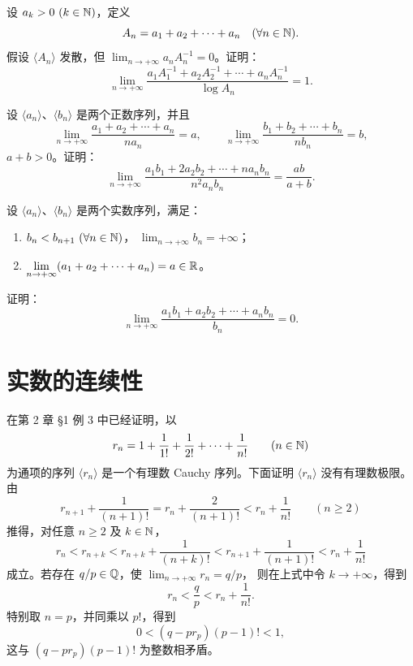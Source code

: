 \begin{exercise}
  \item 设 \(a_k>0\ (k\in\mathbb{N})\)，定义
  \[
  A_n=a_1+a_2+\cdots+a_n\quad(\forall n\in\mathbb{N}).
  \]
  假设 \(\langle A_n\rangle\) 发散，但
  \(\lim_{n\to+\infty}a_nA_n^{-1}=0\)。证明：
  \[
  \lim_{n\to+\infty}
  \frac{a_1A_1^{-1}+a_2A_2^{-1}+\cdots+a_nA_n^{-1}}{\log A_n}=1.
  \]
\end{exercise}

\begin{exercise}
  \item 设 \(\langle a_n\rangle\)、\(\langle b_n\rangle\) 是两个正数序列，并且
  \[
  \lim_{n\to+\infty}\frac{a_1+a_2+\cdots+a_n}{na_n}=a,
  \qquad
  \lim_{n\to+\infty}\frac{b_1+b_2+\cdots+b_n}{nb_n}=b,
  \]
  \(a+b>0\)。证明：
  \[
  \lim_{n\to+\infty}
  \frac{a_1b_1+2a_2b_2+\cdots+na_nb_n}{n^2a_nb_n}
  =\frac{ab}{a+b}.
  \]
\end{exercise}

\begin{exercise}
  \item 设 \(\langle a_n\rangle\)、\(\langle b_n\rangle\) 是两个实数序列，满足：
  \begin{enumerate}[label=\arabic*)]
    \item \(b_n<b_{n+1}\ (\forall n\in\mathbb{N})\)，
    \(\displaystyle\lim_{n\to+\infty}b_n=+\infty\)；
    \item \(\displaystyle\lim_{n\to+\infty}(a_1+a_2+\cdots+a_n)=a\in\mathbb{R}\)。
  \end{enumerate}
  证明：
  \[
  \lim_{n\to+\infty}\frac{a_1b_1+a_2b_2+\cdots+a_nb_n}{b_n}=0.
  \]
\end{exercise}

\section{实数的连续性}

在第 2 章 \S 1 例 3 中已经证明，以
\[
r_n=1+\frac1{1!}+\frac1{2!}+\cdots+\frac1{n!}\qquad(n\in\mathbb{N})
\]
为通项的序列 \(\langle r_n\rangle\) 是一个有理数 Cauchy 序列。下面证明
\(\langle r_n\rangle\) 没有有理数极限。由
\[
r_{n+1}+\frac1{(n+1)!}
=r_n+\frac2{(n+1)!}<r_n+\frac1{n!}\qquad(n\geqslant2)
\]
推得，对任意 \(n\geqslant2\) 及 \(k\in\mathbb{N}\)，
\[
r_n<r_{n+k}<r_{n+k}+\frac1{(n+k)!}
<r_{n+1}+\frac1{(n+1)!}<r_n+\frac1{n!}
\]
成立。若存在 \(q/p\in\mathbb{Q}\)，使 \(\lim_{n\to+\infty}r_n=q/p\)，
则在上式中令 \(k\to+\infty\)，得到
\[
r_n<\frac qp<r_n+\frac1{n!}.
\]
特别取 \(n=p\)，并同乘以 \(p!\)，得到
\[
0<(q-pr_p)(p-1)!<1,
\]
这与 \((q-pr_p)(p-1)!\) 为整数相矛盾。

